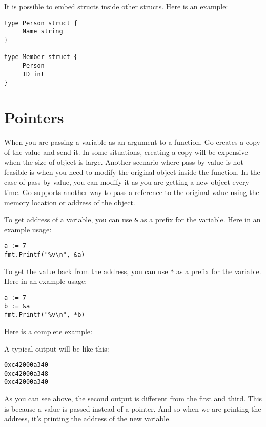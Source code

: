 It is possible to embed structs inside other
structs.  Here is an example:

\begin{lstlisting}[numbers=none]
type Person struct {
     Name string
}

type Member struct {
     Person
     ID int
}
\end{lstlisting}

\section{Pointers}

When you are passing a variable as an argument to a function, Go
creates a copy of the value and send it.  In some situations, creating
a copy will be expensive when the size of object is large.  Another
scenario where pass by value is not feasible is when you need to
modify the original object inside the function.  In the case of pass
by value, you can modify it as you are getting a new object every
time.  Go supports another way to pass a reference to the original
value using the memory location or address of the
object.

To get address of a variable, you can use \texttt{\&} as a prefix for
the variable.  Here in an example usage:

\begin{lstlisting}[numbers=none]
a := 7
fmt.Printf("%v\n", &a)
\end{lstlisting}

To get the value back from the address, you can use \texttt{*} as a
prefix for the variable.  Here in an example usage:

\begin{lstlisting}[numbers=none]
a := 7
b := &a
fmt.Printf("%v\n", *b)
\end{lstlisting}

Here is a complete example:



A typical output will be like this:

\begin{lstlisting}[numbers=none]
0xc42000a340
0xc42000a348
0xc42000a340
\end{lstlisting}

As you can see above, the second output is different from the first
and third.  This is because a value is passed instead of a pointer.
And so when we are printing the address, it's printing the address of
the new variable.

